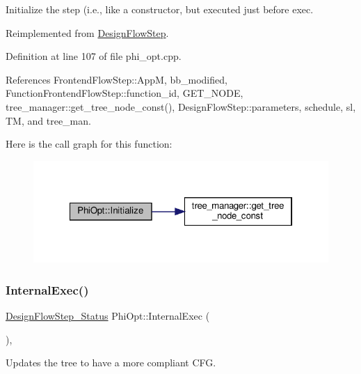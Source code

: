 Initialize the step (i.\+e., like a constructor, but executed just before exec. 



Reimplemented from \hyperlink{classDesignFlowStep_a44b50683382a094976e1d432a7784799}{Design\+Flow\+Step}.



Definition at line 107 of file phi\+\_\+opt.\+cpp.



References Frontend\+Flow\+Step\+::\+AppM, bb\+\_\+modified, Function\+Frontend\+Flow\+Step\+::function\+\_\+id, G\+E\+T\+\_\+\+N\+O\+DE, tree\+\_\+manager\+::get\+\_\+tree\+\_\+node\+\_\+const(), Design\+Flow\+Step\+::parameters, schedule, sl, TM, and tree\+\_\+man.

Here is the call graph for this function\+:
\nopagebreak
\begin{figure}[H]
\begin{center}
\leavevmode
\includegraphics[width=322pt]{dc/ddf/classPhiOpt_a1b620dd1d02ad1accbfe986e02add067_cgraph}
\end{center}
\end{figure}
\mbox{\label{classPhiOpt_aad12a9928fb1f1b7a28777c4480a31f4}} 
\subsubsection{\texorpdfstring{Internal\+Exec()}{InternalExec()}}
{\footnotesize\ttfamily \hyperlink{design__flow__step_8hpp_afb1f0d73069c26076b8d31dbc8ebecdf}{Design\+Flow\+Step\+\_\+\+Status} Phi\+Opt\+::\+Internal\+Exec (\begin{DoxyParamCaption}{ }\end{DoxyParamCaption})\hspace{0.3cm}{\ttfamily [override]}, {\ttfamily [virtual]}}



Updates the tree to have a more compliant C\+FG. 

